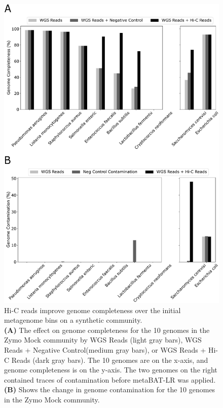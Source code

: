 \documentclass[fleqn,10pt,lineno]{wlpeerj}
\begin{document}
  
\begin{figure}[ht!]
\centering
\includegraphics[scale=0.6]{synthetic_genome_completeness_pure.pdf.pdf}
\caption{Hi-C reads improve genome completeness over the initial metagenome bins on a synthetic community.
    \\\textbf{(A)} The effect on genome completeness for the 10 genomes in the Zymo Mock community by WGS Reads (light gray bars), WGS Reads + Negative Control(medium gray bars), or WGS Reads + Hi-C Reads (dark gray bars). The 10 genomes are on the x-axis, and genome completeness is on the y-axis. The two genomes on the right contained traces of contamination before metaBAT-LR was applied. \textbf{(B)} Shows the change in genome contamination for the 10 genomes in the Zymo Mock community.}
\label{fig:synthetic}
\end{figure}

\end{document}
